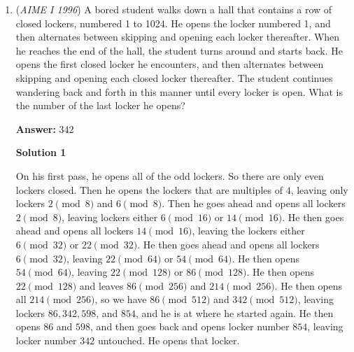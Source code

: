 \begin{enumerate}
\textbf{Solution}

The harmonic mean of $x$ and $y$ is equal to $\frac{1}{\frac{\frac{1}{x}+\frac{1}{y}}2} = \frac{2xy}{x+y}$, so we have $xy=(x+y)(3^{20}\cdot2^{19})$, and by \href{https://artofproblemsolving.com/wiki/index.php?title=SFFT}{SFFT}, $(x-3^{20}\cdot2^{19})(y-3^{20}\cdot2^{19})=3^{40}\cdot2^{38}$. Now, $3^{40}\cdot2^{38}$ has $41\cdot39=1599$ factors, one of which is the square root ($3^{20}2^{19}$). Since $x<y$, the answer is half of the remaining number of factors, which is $\frac{1599-1}{2}= \boxed{799}$.

 \begin{verbatim}
Note: Counting how many positive integer divisors of $n^2$ less than $n$ is also used in \href{https://artofproblemsolving.com/wiki/index.php?title=1995\_AIME\_Problems/Problem\_6}{1995 AIME Problems/Problem 6}.
\end{verbatim}




	\item (\textit{AIME I 1996}) A bored student walks down a hall that contains a row of closed lockers, numbered 1 to 1024. He opens the locker numbered 1, and then alternates between skipping and opening each locker thereafter. When he reaches the end of the hall, the student turns around and starts back. He opens the first closed locker he encounters, and then alternates between skipping and opening each closed locker thereafter. The student continues wandering back and forth in this manner until every locker is open. What is the number of the last locker he opens?


 
 \textbf{Answer: }342



\textbf{Solution 1}

On his first pass, he opens all of the odd lockers. So there are only even lockers closed. Then he opens the lockers that are multiples of $4$, leaving only lockers $2 \pmod{8}$ and $6 \pmod{8}$. Then he goes ahead and opens all lockers $2 \pmod {8}$, leaving lockers either $6 \pmod {16}$ or $14 \pmod {16}$. He then goes ahead and opens all lockers $14 \pmod {16}$, leaving the lockers either $6 \pmod {32}$ or $22 \pmod {32}$. He then goes ahead and opens all lockers $6 \pmod {32}$, leaving $22 \pmod {64}$ or $54 \pmod {64}$. He then opens $54 \pmod {64}$, leaving $22 \pmod {128}$ or $86 \pmod {128}$. He then opens $22 \pmod {128}$ and leaves $86 \pmod {256}$ and $214 \pmod {256}$. He then opens all $214 \pmod {256}$, so we have $86 \pmod {512}$ and $342 \pmod {512}$, leaving lockers $86, 342, 598$, and $854$, and he is at where he started again. He then opens $86$ and $598$, and then goes back and opens locker number $854$, leaving locker number $\boxed{342}$ untouched. He opens that locker.


\end{enumerate}
